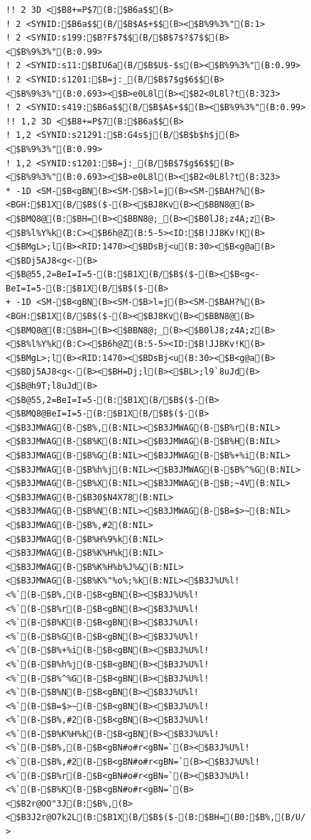 \documentclass[a4j]{jarticle}
\begin{document}
{{{{{{{{{\begin{figure}[t]
\begin{center}
\begin{minipage}{\hsize}
\begin{verbatim}
!! 2 3D <$B8+=P$7(B:$B6a$$(B>
! 2 <SYNID:$B6a$$(B/$B$A$+$$(B><$B%9%3%"(B:1>
! 2 <SYNID:s199:$B?F$7$$(B/$B$7$?$7$$(B><$B%9%3%"(B:0.99>
! 2 <SYNID:s11:$BIU6a(B/$B$U$-$s(B><$B%9%3%"(B:0.99>
! 2 <SYNID:s1201:$B=j:_(B/$B$7$g$6$$(B><$B%9%3%"(B:0.693><$B>e0L8l(B><$B2<0L8l?t(B:323>
! 2 <SYNID:s419:$B6a$$(B/$B$A$+$$(B><$B%9%3%"(B:0.99>
!! 1,2 3D <$B8+=P$7(B:$B6a$$(B>
! 1,2 <SYNID:s21291:$B:G4s$j(B/$B$b$h$j(B><$B%9%3%"(B:0.99>
! 1,2 <SYNID:s1201:$B=j:_(B/$B$7$g$6$$(B><$B%9%3%"(B:0.693><$B>e0L8l(B><$B2<0L8l?t(B:323>
* -1D <SM-$B<gBN(B><SM-$B>l=j(B><SM-$BAH?%(B><BGH:$B1X(B/$B$($-(B><$BJ8Kv(B><$BBN8@(B><$BMQ8@(B:$BH=(B><$BBN8@;_(B><$B0lJ8;z4A;z(B><$B%l%Y%k(B:C><$B6h@Z(B:5-5><ID:$B!JJ8Kv!K(B><$BMgL>;l(B><RID:1470><$BDsBj<u(B:30><$B<g@a(B><$BDj5AJ8<g<-(B><$B@55,2=BeI=I=5-(B:$B1X(B/$B$($-(B><$B<g<-BeI=I=5-(B:$B1X(B/$B$($-(B>
+ -1D <SM-$B<gBN(B><SM-$B>l=j(B><SM-$BAH?%(B><BGH:$B1X(B/$B$($-(B><$BJ8Kv(B><$BBN8@(B><$BMQ8@(B:$BH=(B><$BBN8@;_(B><$B0lJ8;z4A;z(B><$B%l%Y%k(B:C><$B6h@Z(B:5-5><ID:$B!JJ8Kv!K(B><$BMgL>;l(B><RID:1470><$BDsBj<u(B:30><$B<g@a(B><$BDj5AJ8<g<-(B><$BH=Dj;l(B><$BL>;l9`8uJd(B><$B@h9T;l8uJd(B><$B@55,2=BeI=I=5-(B:$B1X(B/$B$($-(B><$BMQ8@BeI=I=5-(B:$B1X(B/$B$($-(B><$B3JMWAG(B-$B%,(B:NIL><$B3JMWAG(B-$B%r(B:NIL><$B3JMWAG(B-$B%K(B:NIL><$B3JMWAG(B-$B%H(B:NIL><$B3JMWAG(B-$B%G(B:NIL><$B3JMWAG(B-$B%+%i(B:NIL><$B3JMWAG(B-$B%h%j(B:NIL><$B3JMWAG(B-$B%^%G(B:NIL><$B3JMWAG(B-$B%X(B:NIL><$B3JMWAG(B-$B;~4V(B:NIL><$B3JMWAG(B-$B30$N4X78(B:NIL><$B3JMWAG(B-$B%N(B:NIL><$B3JMWAG(B-$B=$>~(B:NIL><$B3JMWAG(B-$B%,#2(B:NIL><$B3JMWAG(B-$B%H%9%k(B:NIL><$B3JMWAG(B-$B%K%H%k(B:NIL><$B3JMWAG(B-$B%K%H%b%J%&(B:NIL><$B3JMWAG(B-$B%K%"%o%;%k(B:NIL><$B3J%U%l!<%`(B-$B%,(B-$B<gBN(B><$B3J%U%l!<%`(B-$B%r(B-$B<gBN(B><$B3J%U%l!<%`(B-$B%K(B-$B<gBN(B><$B3J%U%l!<%`(B-$B%G(B-$B<gBN(B><$B3J%U%l!<%`(B-$B%+%i(B-$B<gBN(B><$B3J%U%l!<%`(B-$B%h%j(B-$B<gBN(B><$B3J%U%l!<%`(B-$B%^%G(B-$B<gBN(B><$B3J%U%l!<%`(B-$B%N(B-$B<gBN(B><$B3J%U%l!<%`(B-$B=$>~(B-$B<gBN(B><$B3J%U%l!<%`(B-$B%,#2(B-$B<gBN(B><$B3J%U%l!<%`(B-$B%K%H%k(B-$B<gBN(B><$B3J%U%l!<%`(B-$B%,(B-$B<gBN#o#r<gBN=`(B><$B3J%U%l!<%`(B-$B%,#2(B-$B<gBN#o#r<gBN=`(B><$B3J%U%l!<%`(B-$B%r(B-$B<gBN#o#r<gBN=`(B><$B3J%U%l!<%`(B-$B%K(B-$B<gBN#o#r<gBN=`(B><$B2r@OO"3J(B:$B%,(B><$B3J2r@O7k2L(B:$B1X(B/$B$($-(B:$BH=(B0:$B%,(B/U/-/-/-/-;$B%r(B/U/-/-/-/-;$B%K(B/U/-/-/-/-;$B%H(B/U/-/-/-/-;$B%G(B/U/-/-/-/-;$B%+%i(B/U/-/-/-/-;$B%h%j(B/U/-/-/-/-;$B%^%G(B/U/-/-/-/-;$B%X(B/U/-/-/-/-;$B;~4V(B/U/-/-/-/-;$B30$N4X78(B/U/-/-/-/-;$B%N(B/U/-/-/-/-;$B=$>~(B/U/-/-/-/-;$B%,#2(B/U/-/-/-/-;$B%H%9%k(B/U/-/-/-/-;$B%K%H%k(B/U/-/-/-/-;$B%K%H%b%J%&(B/U/-/-/-/-;$B%K%"%o%;%k(B/U/-/-/-/->

\end{verbatim}
\end{minipage}
\end{center}
\end{figure}}}}}}}}}}
\end{document}
